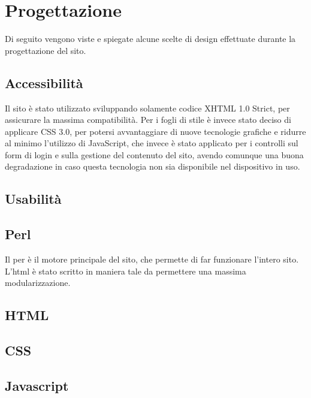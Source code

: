 \section{Progettazione}

Di seguito vengono viste e spiegate alcune scelte di design effettuate durante la progettazione del sito.

\subsection{Accessibilità}
Il sito è stato utilizzato sviluppando solamente codice XHTML 1.0 Strict, per assicurare la massima compatibilità. Per i fogli di stile è invece stato deciso di applicare CSS 3.0, per potersi avvantaggiare di nuove tecnologie grafiche e ridurre al minimo l'utilizzo di JavaScript, che invece è stato applicato per i controlli sul form di login e sulla gestione del contenuto del sito, avendo comunque una buona degradazione in caso questa tecnologia non sia disponibile nel dispositivo in uso.

\subsection{Usabilità}

\subsection{Perl}
Il per \`e il motore principale del sito, che permette di far funzionare l'intero sito. L'html \`e stato scritto in maniera tale da permettere una massima modularizzazione.

\subsection{HTML}

\subsection{CSS}

\subsection{Javascript}
